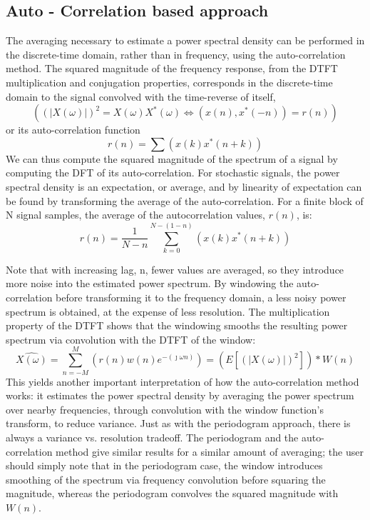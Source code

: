 \documentclass[10pt,english]{article}
\begin{document}
\subsection{Auto - Correlation based approach}
The averaging necessary to estimate a power spectral density can be performed in the discrete-time domain, rather than in frequency, using the auto-correlation method. The squared magnitude of the frequency response, from the DTFT multiplication and conjugation properties, corresponds in the discrete-time domain to the signal convolved with the time-reverse of itself,
\begin{equation}
\left( \left( \left| X(\omega)\right|  \right)^2 =   X(\omega) X^*(\omega) \iff (x(n), x^*(-n) ) = r(n) \right)
\end{equation}
or its auto-correlation function
\begin{equation}
r(n) = \sum ( x(k) x^* (n + k))
\end{equation}
We can thus compute the squared magnitude of the spectrum of a signal by computing the DFT of its auto-correlation. For stochastic signals, the power spectral density is an expectation, or average, and by linearity of expectation can be found by transforming the average of the auto-correlation. For a finite block of N signal samples, the average of the autocorrelation values, $r(n)$, is:
\begin{equation}
r(n) = \frac{1}{N-n} \sum_{k = 0}^{N - (1-n)} ( x(k) x^* (n + k))
\end{equation}


Note that with increasing lag, n, fewer values are averaged, so they introduce more noise into the estimated power spectrum. By windowing the auto-correlation before transforming it to the frequency domain, a less noisy power spectrum is obtained, at the expense of less resolution. The multiplication property of the DTFT shows that the windowing smooths the resulting power spectrum via convolution with the DTFT of the window:
\begin{equation}
\hat{X(\omega)} = \sum_{n = -M}^{M} (r(n) w(n) e^{- \left( \jmath \omega n \right)} ) = \left( E \left[ \left( \left| X(\omega)\right|  \right)^2 \right] \right) * W(n)
\end{equation}
This yields another important interpretation of how the auto-correlation method works: it estimates the power spectral density by averaging the power spectrum over nearby frequencies, through convolution with the window function's transform, to reduce variance. Just as with the periodogram approach, there is always a variance vs. resolution tradeoff. The periodogram and the auto-correlation method give similar results for a similar amount of averaging; the user should simply note that in the periodogram case, the window introduces smoothing of the spectrum via frequency convolution before squaring the magnitude, whereas the periodogram convolves the squared magnitude with $W(n)$.\\
\end{document}
